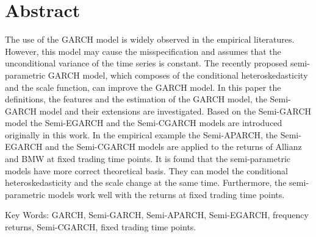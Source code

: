 \chapter*{\centering Abstract}\label{secAbstrct}

The use of the GARCH model is widely observed in the empirical literatures. However, this model may cause the misspecification and assumes that the unconditional variance of the time series is constant. The recently proposed semi-parametric GARCH model, which composes of the conditional heteroskedasticity and the scale function, can improve the GARCH model. In this paper the definitions, the features and the estimation of the GARCH model, the Semi-GARCH model and their extensions are investigated. Based on the Semi-GARCH model the Semi-EGARCH and the Semi-CGARCH models are introduced originally in this work. In the empirical example the Semi-APARCH, the Semi-EGARCH and the Semi-CGARCH models are applied to the returns of Allianz and BMW at fixed trading time points. It is found that the semi-parametric models have more correct theoretical basis. They can model the conditional heteroskedasticity and the scale change at the same time. Furthermore, the semi-parametric models work well with the returns at fixed trading time points.

Key Words: GARCH, Semi-GARCH, Semi-APARCH, Semi-EGARCH, frequency returns, Semi-CGARCH,  fixed trading time points.

